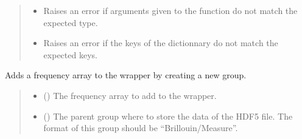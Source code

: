 \documentclass[letterpaper,10pt,english]{sphinxmanual}
\begin{document}
\begin{fulllineitems}
\begin{fulllineitems}
\begin{quote}
\begin{description}
\begin{itemize}
\item {} 
\sphinxAtStartPar
{\hyperref[\detokenize{source/_autosummary/HDF5_BLS.errors:HDF5_BLS.errors.WrapperError_ArgumentType}]{}} \textendash{} Raises an error if arguments given to the function do not match the expected type.

\item {} 
\sphinxAtStartPar
{} \textendash{} Raises an error if the keys of the dictionnary do not match the expected keys.

\end{itemize}

\end{description}\end{quote}

\end{fulllineitems}


\begin{fulllineitems}
\label{\detokenize{source/_autosummary/HDF5_BLS.Wrapper:HDF5_BLS.Wrapper.add_frequency}}
\pysigstartsignatures
\pysiglinewithargsret
{}
{\sphinxparamcomma {}\sphinxparamcomma {}\sphinxparamcomma {}}
{}
\pysigstopsignatures
\sphinxAtStartPar
Adds a frequency array to the wrapper by creating a new group.
\begin{quote}\begin{description}
\begin{itemize}
\item {} 
\sphinxAtStartPar
{} () \textendash{} The frequency array to add to the wrapper.

\item {} 
\sphinxAtStartPar
{} (\sphinxstyleliteralemphasis{\sphinxupquote{, }}) \textendash{} The parent group where to store the data of the HDF5 file. The format of this group should be “Brillouin/Measure”.


\end{itemize}
\end{description}
\end{quote}
\end{fulllineitems}
\end{fulllineitems}
\end{document}
